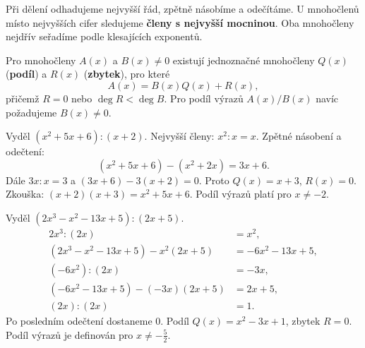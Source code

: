 \documentclass[11pt,a4paper]{article}
\begin{document}
Při dělení odhadujeme nejvyšší řád, zpětně násobíme a odečítáme. U mnohočlenů místo nejvyšších cifer sledujeme \textbf{členy s nejvyšší mocninou}. Oba mnohočleny nejdřív seřadíme podle klesajících exponentů.
\begin{zadaniBox}[title={Věta - Dělení mnohočlenů se zbytkem}]
Pro mnohočleny $A(x)$ a $B(x)\ne0$ existují jednoznačné mnohočleny $Q(x)$ (\textbf{podíl}) a $R(x)$ (\textbf{zbytek}), pro které
\[A(x)=B(x)Q(x)+R(x),\]
přičemž $R=0$ nebo $\deg R<\deg B$. Pro podíl výrazů $A(x)/B(x)$ navíc požadujeme $B(x)\ne0$.
\end{zadaniBox}
\begin{prikladReseniBox}[breakable=false,title={Příklad 1}]
Vyděl $(x^2+5x+6):(x+2)$.
\tcblower
Nejvyšší členy: $x^2:x=x$. Zpětné násobení a odečtení:
\[(x^2+5x+6)-(x^2+2x)=3x+6.\]
Dále $3x:x=3$ a $(3x+6)-3(x+2)=0$. Proto $Q(x)=x+3$, $R(x)=0$. Zkouška: $(x+2)(x+3)=x^2+5x+6$. Podíl výrazů platí pro $x\ne-2$.
\end{prikladReseniBox}
\begin{prikladReseniBox}[breakable=false,title={Příklad 2}]
Vyděl $(2x^3-x^2-13x+5):(2x+5)$.
\tcblower
\begin{align*}
2x^3:(2x)&=x^2,\\
(2x^3-x^2-13x+5)-x^2(2x+5)&=-6x^2-13x+5,\\
(-6x^2):(2x)&=-3x,\\
(-6x^2-13x+5)-(-3x)(2x+5)&=2x+5,\\
(2x):(2x)&=1.
\end{align*}
Po posledním odečtení dostaneme $0$. Podíl $Q(x)=x^2-3x+1$, zbytek $R=0$. Podíl výrazů je definován pro $x\ne-\frac52$.
\end{prikladReseniBox}
\end{document}
